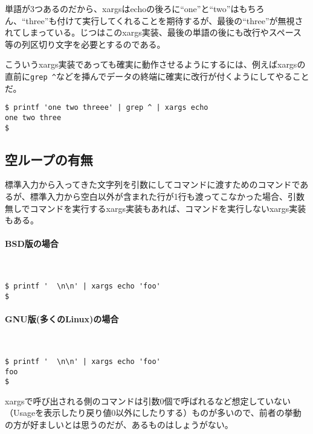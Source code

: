 単語が3つあるのだから、xargsはechoの後ろに``one''と``two''はもちろん、``three''も付けて実行してくれることを期待するが、最後の``three''が無視されてしまっている。じつはこのxargs実装、最後の単語の後にも改行やスペース等の列区切り文字を必要とするのである。

こういうxargs実装であっても確実に動作させるようにするには、例えばxargsの直前に\verb|grep ^|などを挿んでデータの終端に確実に改行が付くようにしてやることだ。

\begin{screen}
	\verb!$ printf 'one two threee' | grep ^ | xargs echo! \return \\
	\verb|one two three|                                           \\
	\verb|$ |
\end{screen}

\subsection*{空ループの有無}

標準入力から入ってきた文字列を引数にしてコマンドに渡すためのコマンドであるが、標準入力から空白以外が含まれた行が1行も渡ってこなかった場合、引数無しでコマンドを実行するxargs実装もあれば、コマンドを実行しないxargs実装もある。

\paragraph{BSD版の場合} 　\\
\begin{screen}
	\verb!$ printf '  \n\n' | xargs echo 'foo'! \return \\
	\verb|$ |
\end{screen}

\paragraph{GNU版(多くのLinux)の場合} 　\\
\begin{screen}
	\verb!$ printf '  \n\n' | xargs echo 'foo'! \return \\
	\verb|foo|                                          \\
	\verb|$ |
\end{screen}

xargsで呼び出される側のコマンドは引数0個で呼ばれるなど想定していない（Usageを表示したり戻り値0以外にしたりする）ものが多いので、前者の挙動の方が好ましいとは思うのだが、あるものはしょうがない。

